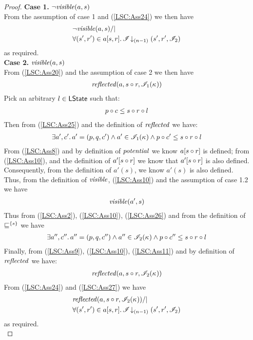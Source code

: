 \begin{lemma}
\begin{proof}
\noindent\textbf{Case 1. } $ \neg \mathit{visible}(a, s)$\\
From the assumption of case 1 and (\ref{LSC:Ass24}) we then have
%
\begin{align*}
	& \neg\mathit{visible}(a, s) /| \\
	&\forall (s', r') \in a[s, r].\, \mathscr{I} \!\downarrow_{(n-1)} \left(s', r', \mathscr{I}_2\right)
\end{align*}
%
as required.\\
%
%
%
%

\noindent\textbf{Case 2. } $\mathit{visible}(a, s)$\\
From (\ref{LSC:Ass20}) and the assumption of case 2 we then have
%
\begin{align}
	\mathit{reflected}(a, s \circ r, \mathscr{I}_1(\kappa_{}))
	\label{LSC:Ass25}
\end{align}
%
Pick an arbitrary $l \in \textsf{LState}$ such that:
%
\begin{align}
	p \circ c \leq s \circ r \circ l \label{LSC:Ass9}
\end{align}
%
Then from (\ref{LSC:Ass25}) and the definition of $\mathit{reflected}$ we have:
\begin{align}
	\exists a', c'.\, a' = (p, q, c') \land a' \in \mathscr{I}_1(\kappa_{}) \land  p \circ c' \leq s \circ r \circ l \label{LSC:Ass10}
\end{align}
From (\ref{LSC:Ass8}) and by definition of $\mathit{potential}$ we know $a[s \circ r]$ is defined; from (\ref{LSC:Ass10}), and the definition of $a'[s \circ r]$ we know that $a'[s \circ r]$ is also defined. Consequently, from the definition of $a'(s)$, we know $a'(s)$ is also defined. Thus, from the definition of $\mathit{visible}$, (\ref{LSC:Ass10}) and the assumption of case 1.2 we have 
%
\begin{align}
	\mathit{visible}(a', s)
	\label{LSC:Ass26}
\end{align}
%
Thus from (\ref{LSC:Ass2}), (\ref{LSC:Ass10}), (\ref{LSC:Ass26}) and from the definition of $\sqsubseteq^{\{s\}}$ we have 
%
\begin{align}
	\exists a'', c''.\, a'' = (p, q, c'') \land a'' \in \mathscr{I}_2(\kappa_{}) \land  p \circ c'' \leq s \circ r \circ l  \label{LSC:Ass11}
\end{align} 
%
Finally, from (\ref{LSC:Ass9}), (\ref{LSC:Ass10}), (\ref{LSC:Ass11}) and by definition of $\mathit{reflected}$ we have:
%
\begin{align}
	\mathit{reflected}(a, s \circ r, \mathscr{I}_2(\kappa_{}))
	\label{LSC:Ass27}
\end{align} 
%
From (\ref{LSC:Ass24}) and (\ref{LSC:Ass27}) we have
\begin{align*}
	&\mathit{reflected}(a, s \circ r, \mathscr{I}_2(\kappa_{})) /| \\
	&\forall (s', r') \in a[s, r].\, \mathscr{I} \!\downarrow_{(n-1)} \left(s', r', \mathscr{I}_2\right)
\end{align*}
%
as required.\\
%
%
%
%

\end{proof}
\end{lemma}
%
%
%
%
%
%

